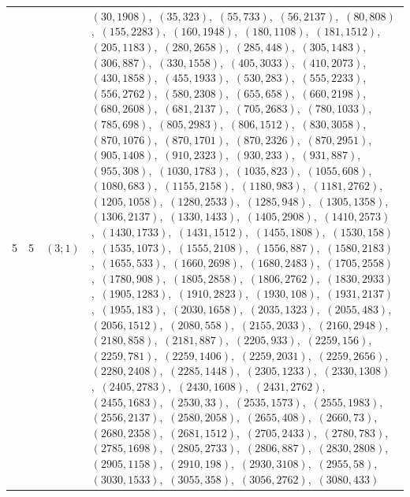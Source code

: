 \documentclass[11pt]{article}
\begin{document}
\begin{longtable}{@{}rrl>{\raggedright\arraybackslash}p{}@{}}
5 & 5 & $(3;1)$ & $(30,1908)$,\allowbreak\ $(35,323)$,\allowbreak\ $(55,733)$,\allowbreak\ $(56,2137)$,\allowbreak\ $(80,808)$,\allowbreak\ $(155,2283)$,\allowbreak\ $(160,1948)$,\allowbreak\ $(180,1108)$,\allowbreak\ $(181,1512)$,\allowbreak\ $(205,1183)$,\allowbreak\ $(280,2658)$,\allowbreak\ $(285,448)$,\allowbreak\ $(305,1483)$,\allowbreak\ $(306,887)$,\allowbreak\ $(330,1558)$,\allowbreak\ $(405,3033)$,\allowbreak\ $(410,2073)$,\allowbreak\ $(430,1858)$,\allowbreak\ $(455,1933)$,\allowbreak\ $(530,283)$,\allowbreak\ $(555,2233)$,\allowbreak\ $(556,2762)$,\allowbreak\ $(580,2308)$,\allowbreak\ $(655,658)$,\allowbreak\ $(660,2198)$,\allowbreak\ $(680,2608)$,\allowbreak\ $(681,2137)$,\allowbreak\ $(705,2683)$,\allowbreak\ $(780,1033)$,\allowbreak\ $(785,698)$,\allowbreak\ $(805,2983)$,\allowbreak\ $(806,1512)$,\allowbreak\ $(830,3058)$,\allowbreak\ $(870,1076)$,\allowbreak\ $(870,1701)$,\allowbreak\ $(870,2326)$,\allowbreak\ $(870,2951)$,\allowbreak\ $(905,1408)$,\allowbreak\ $(910,2323)$,\allowbreak\ $(930,233)$,\allowbreak\ $(931,887)$,\allowbreak\ $(955,308)$,\allowbreak\ $(1030,1783)$,\allowbreak\ $(1035,823)$,\allowbreak\ $(1055,608)$,\allowbreak\ $(1080,683)$,\allowbreak\ $(1155,2158)$,\allowbreak\ $(1180,983)$,\allowbreak\ $(1181,2762)$,\allowbreak\ $(1205,1058)$,\allowbreak\ $(1280,2533)$,\allowbreak\ $(1285,948)$,\allowbreak\ $(1305,1358)$,\allowbreak\ $(1306,2137)$,\allowbreak\ $(1330,1433)$,\allowbreak\ $(1405,2908)$,\allowbreak\ $(1410,2573)$,\allowbreak\ $(1430,1733)$,\allowbreak\ $(1431,1512)$,\allowbreak\ $(1455,1808)$,\allowbreak\ $(1530,158)$,\allowbreak\ $(1535,1073)$,\allowbreak\ $(1555,2108)$,\allowbreak\ $(1556,887)$,\allowbreak\ $(1580,2183)$,\allowbreak\ $(1655,533)$,\allowbreak\ $(1660,2698)$,\allowbreak\ $(1680,2483)$,\allowbreak\ $(1705,2558)$,\allowbreak\ $(1780,908)$,\allowbreak\ $(1805,2858)$,\allowbreak\ $(1806,2762)$,\allowbreak\ $(1830,2933)$,\allowbreak\ $(1905,1283)$,\allowbreak\ $(1910,2823)$,\allowbreak\ $(1930,108)$,\allowbreak\ $(1931,2137)$,\allowbreak\ $(1955,183)$,\allowbreak\ $(2030,1658)$,\allowbreak\ $(2035,1323)$,\allowbreak\ $(2055,483)$,\allowbreak\ $(2056,1512)$,\allowbreak\ $(2080,558)$,\allowbreak\ $(2155,2033)$,\allowbreak\ $(2160,2948)$,\allowbreak\ $(2180,858)$,\allowbreak\ $(2181,887)$,\allowbreak\ $(2205,933)$,\allowbreak\ $(2259,156)$,\allowbreak\ $(2259,781)$,\allowbreak\ $(2259,1406)$,\allowbreak\ $(2259,2031)$,\allowbreak\ $(2259,2656)$,\allowbreak\ $(2280,2408)$,\allowbreak\ $(2285,1448)$,\allowbreak\ $(2305,1233)$,\allowbreak\ $(2330,1308)$,\allowbreak\ $(2405,2783)$,\allowbreak\ $(2430,1608)$,\allowbreak\ $(2431,2762)$,\allowbreak\ $(2455,1683)$,\allowbreak\ $(2530,33)$,\allowbreak\ $(2535,1573)$,\allowbreak\ $(2555,1983)$,\allowbreak\ $(2556,2137)$,\allowbreak\ $(2580,2058)$,\allowbreak\ $(2655,408)$,\allowbreak\ $(2660,73)$,\allowbreak\ $(2680,2358)$,\allowbreak\ $(2681,1512)$,\allowbreak\ $(2705,2433)$,\allowbreak\ $(2780,783)$,\allowbreak\ $(2785,1698)$,\allowbreak\ $(2805,2733)$,\allowbreak\ $(2806,887)$,\allowbreak\ $(2830,2808)$,\allowbreak\ $(2905,1158)$,\allowbreak\ $(2910,198)$,\allowbreak\ $(2930,3108)$,\allowbreak\ $(2955,58)$,\allowbreak\ $(3030,1533)$,\allowbreak\ $(3055,358)$,\allowbreak\ $(3056,2762)$,\allowbreak\ $(3080,433)$\\

\end{longtable}
\end{document}
